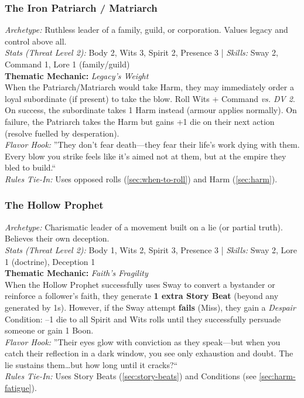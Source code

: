 \subsubsection{The Iron Patriarch / Matriarch}
\textit{Archetype:} Ruthless leader of a family, guild, or corporation. Values legacy and control above all.\\
\textit{Stats (Threat Level 2):} Body 2, Wits 3, Spirit 2, Presence 3 \quad | \quad \textit{Skills:} Sway 2, Command 1, Lore 1 (family/guild)\\
\textbf{Thematic Mechanic:} \textit{Legacy's Weight} \\
When the Patriarch/Matriarch would take Harm, they may immediately order a loyal subordinate (if present) to take the blow. Roll Wits + Command \textit{vs. DV 2}. On success, the subordinate takes 1 Harm instead (armour applies normally). On failure, the Patriarch takes the Harm but gains +1 die on their next action (resolve fuelled by desperation).\\
\textit{Flavor Hook:} ''They don't fear death---they fear their life's work dying with them. Every blow you strike feels like it's aimed not at them, but at the empire they bled to build.``\\
\textit{Rules Tie-In:} Uses opposed rolls (\autoref{sec:when-to-roll}) and Harm (\autoref{sec:harm}).

\subsubsection{The Hollow Prophet}
\textit{Archetype:} Charismatic leader of a movement built on a lie (or partial truth). Believes their own deception.\\
\textit{Stats (Threat Level 2):} Body 1, Wits 2, Spirit 3, Presence 3 \quad | \quad \textit{Skills:} Sway 2, Lore 1 (doctrine), Deception 1\\
\textbf{Thematic Mechanic:} \textit{Faith's Fragility} \\
When the Hollow Prophet successfully uses Sway to convert a bystander or reinforce a follower's faith, they generate \textbf{1 extra Story Beat} (beyond any generated by 1s). However, if the Sway attempt \textbf{fails} (Miss), they gain a \textit{Despair} Condition: --1 die to all Spirit and Wits rolls until they successfully persuade someone or gain 1 Boon.\\
\textit{Flavor Hook:} ''Their eyes glow with conviction as they speak---but when you catch their reflection in a dark window, you see only exhaustion and doubt. The lie sustains them\dots but how long until it cracks?``\\
\textit{Rules Tie-In:} Uses Story Beats (\autoref{sec:story-beats}) and Conditions (see \autoref{sec:harm-fatigue}).

